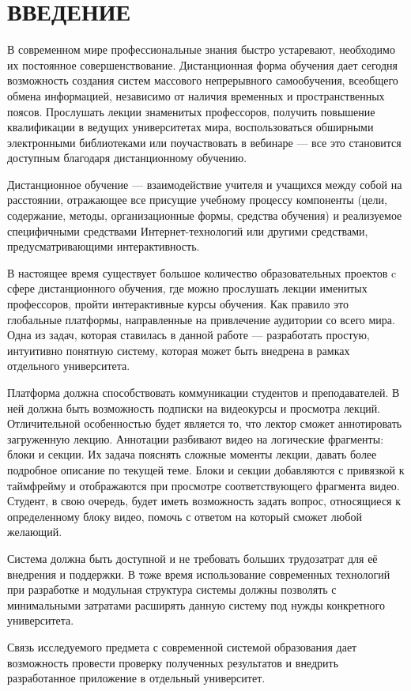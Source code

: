 \section*{ВВЕДЕНИЕ}

В современном мире профессиональные знания быстро устаревают,
необходимо их постоянное совершенствование.
Дистанционная форма обучения дает сегодня возможность создания систем массового непрерывного
самообучения, всеобщего обмена информацией,
независимо от наличия временных и пространственных поясов.
Прослушать лекции знаменитых профессоров, получить повышение квалификации
в ведущих университетах мира, воспользоваться обширными электронными библиотеками
или поучаствовать в вебинаре — все это становится доступным благодаря дистанционному обучению.

Дистанционное обучение — взаимодействие учителя и учащихся между собой на расстоянии,
отражающее все присущие учебному процессу компоненты (цели, содержание, методы,
организационные формы, средства обучения) и реализуемое специфичными средствами
Интернет-технологий или другими средствами, предусматривающими интерактивность.

В настоящее время существует большое количество образовательных проектов c сфере дистанционного
обучения, где можно прослушать лекции именитых профессоров, пройти интерактивные курсы обучения.
Как правило это глобальные платформы, направленные на привлечение аудитории со всего мира.
Одна из задач, которая ставилась в данной работе — разработать простую,
интуитивно понятную систему, которая может быть внедрена в рамках отдельного университета.


Платформа должна способствовать коммуникации студентов и преподавателей.
В ней должна быть возможность подписки на видеокурсы и просмотра лекций.
Отличительной особенностью будет является то, что лектор сможет аннотировать загруженную лекцию.
Аннотации разбивают видео на логические фрагменты: блоки и секции.
Их задача пояснять сложные моменты лекции, давать более подробное описание по текущей теме.
Блоки и секции добавляются с привязкой к таймфрейму и отображаются при просмотре соответствующего
фрагмента видео.
Студент, в свою очередь, будет иметь возможность задать вопрос, относящиеся к определенному
блоку видео, помочь с ответом на который сможет любой желающий.

Система должна быть доступной и не требовать больших трудозатрат для её внедрения и поддержки.
В тоже время использование современных технологий при разработке и модульная структура
системы должны позволять с минимальными затратами расширять данную систему под нужды
конкретного университета.

Связь исследуемого предмета с современной системой образования дает возможность
провести проверку полученных результатов и внедрить разработанное приложение в
отдельный университет.
